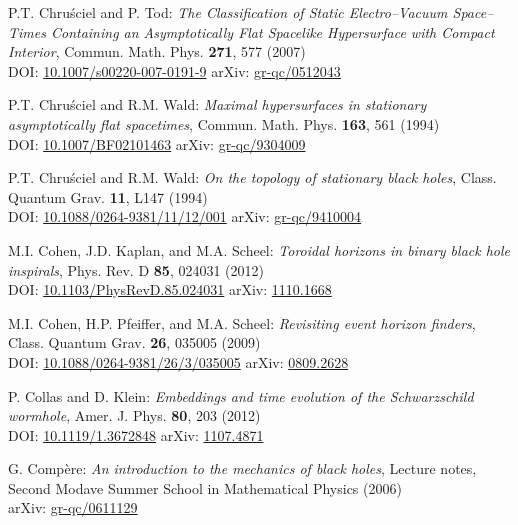 \begin{thebibliography}{123}
P.T. Chru\'sciel and P. Tod:
{\em The Classification of Static Electro–Vacuum Space–Times Containing an Asymptotically Flat Spacelike Hypersurface with Compact Interior},
Commun. Math. Phys. {\bf 271}, 577 (2007)\\
DOI: \href{https://doi.org/10.1007/s00220-007-0191-9}{10.1007/s00220-007-0191-9}\hfill
arXiv: \href{https://arxiv.org/abs/gr-qc/0512043}{gr-qc/0512043}

P.T. Chru\'sciel and R.M. Wald:
{\em Maximal hypersurfaces in stationary asymptotically flat spacetimes},
Commun. Math. Phys. {\bf 163}, 561 (1994)\\
DOI: \href{https://doi.org/10.1007/BF02101463}{10.1007/BF02101463}\hfill
arXiv: \href{https://arxiv.org/abs/gr-qc/9304009}{gr-qc/9304009}

P.T. Chru\'sciel and R.M. Wald:
{\em On the topology of stationary black holes},
Class. Quantum Grav. {\bf 11}, L147 (1994)\\
DOI: \href{https://doi.org/10.1088/0264-9381/11/12/001}{10.1088/0264-9381/11/12/001}\hfill
arXiv: \href{https://arxiv.org/abs/gr-qc/9410004}{gr-qc/9410004}

M.I. Cohen, J.D. Kaplan, and M.A. Scheel:
{\em Toroidal horizons in binary black hole inspirals},
Phys. Rev. D {\bf 85}, 024031 (2012)\\
DOI: \href{https://doi.org/10.1103/PhysRevD.85.024031}{10.1103/PhysRevD.85.024031}\hfill
arXiv: \href{https://arxiv.org/abs/1110.1668}{1110.1668}

M.I. Cohen, H.P. Pfeiffer, and M.A. Scheel:
{\em Revisiting event horizon finders},
Class. Quantum Grav. {\bf 26}, 035005 (2009)\\
DOI: \href{https://doi.org/10.1088/0264-9381/26/3/035005}{10.1088/0264-9381/26/3/035005}\hfill
arXiv: \href{https://arxiv.org/abs/0809.2628}{0809.2628}

P. Collas and D. Klein:
{\em Embeddings and time evolution of the Schwarzschild wormhole},
Amer. J. Phys. {\bf 80}, 203 (2012)\\
DOI: \href{https://doi.org/10.1119/1.3672848}{10.1119/1.3672848}\hfill
arXiv: \href{https://arxiv.org/abs/1107.4871}{1107.4871}

G. Compère:
{\em An introduction to the mechanics of black holes},
Lecture notes, Second Modave Summer School in Mathematical Physics (2006)\\
arXiv: \href{https://arxiv.org/abs/gr-qc/0611129}{gr-qc/0611129}


\end{thebibliography}
